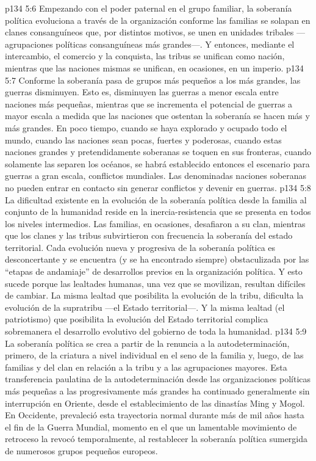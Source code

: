 \vs p134 5:6 Empezando con el poder paternal en el grupo familiar, la soberanía política evoluciona a través de la organización conforme las familias se solapan en clanes consanguíneos que, por distintos motivos, se unen en unidades tribales ---agrupaciones políticas consanguíneas más grandes---. Y entonces, mediante el intercambio, el comercio y la conquista, las tribus se unifican como nación, mientras que las naciones mismas se unifican, en ocasiones, en un imperio.
\vs p134 5:7 Conforme la soberanía pasa de grupos más pequeños a los más grandes, las guerras disminuyen. Esto es, disminuyen las guerras a menor escala entre naciones más pequeñas, mientras que se incrementa el potencial de guerras a mayor escala a medida que las naciones que ostentan la soberanía se hacen más y más grandes. En poco tiempo, cuando se haya explorado y ocupado todo el mundo, cuando las naciones sean pocas, fuertes y poderosas, cuando estas naciones grandes y pretendidamente soberanas se toquen en sus fronteras, cuando solamente las separen los océanos, se habrá establecido entonces el escenario para guerras a gran escala, conflictos mundiales. Las denominadas naciones soberanas no pueden entrar en contacto sin generar conflictos y devenir en guerras.
\vs p134 5:8 La dificultad existente en la evolución de la soberanía política desde la familia al conjunto de la humanidad reside en la inercia\hyp{}resistencia que se presenta en todos los niveles intermedios. Las familias, en ocasiones, desafiaron a su clan, mientras que los clanes y las tribus subvirtieron con frecuencia la soberanía del estado territorial. Cada evolución nueva y progresiva de la soberanía política es desconcertante y se encuentra (y se ha encontrado siempre) obstaculizada por las “etapas de andamiaje” de desarrollos previos en la organización política. Y esto sucede porque las lealtades humanas, una vez que se movilizan, resultan difíciles de cambiar. La misma lealtad que posibilita la evolución de la tribu, dificulta la evolución de la supratribu ---el Estado territorial---. Y la misma lealtad (el patriotismo) que posibilita la evolución del Estado territorial complica sobremanera el desarrollo evolutivo del gobierno de toda la humanidad.
\vs p134 5:9 La soberanía política se crea a partir de la renuncia a la autodeterminación, primero, de la criatura a nivel individual en el seno de la familia y, luego, de las familias y del clan en relación a la tribu y a las agrupaciones mayores. Esta transferencia paulatina de la autodeterminación desde las organizaciones políticas más pequeñas a las progresivamente más grandes ha continuado generalmente sin interrupción en Oriente, desde el establecimiento de las dinastías Ming y Mogol. En Occidente, prevaleció esta trayectoria normal durante más de mil años hasta el fin de la Guerra Mundial, momento en el que un lamentable movimiento de retroceso la revocó temporalmente, al restablecer la soberanía política sumergida de numerosos grupos pequeños europeos.
